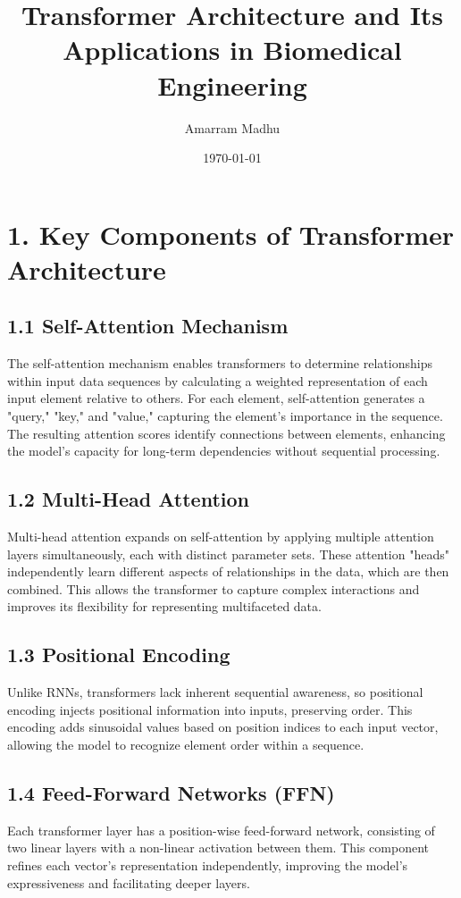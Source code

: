 \documentclass[12pt]{article}
\title{Transformer Architecture and Its Applications in Biomedical Engineering}
\author{Amarram Madhu}
\date{\today}
\begin{document}
\maketitle

\section*{1. Key Components of Transformer Architecture}

\subsection*{1.1 Self-Attention Mechanism}
The self-attention mechanism enables transformers to determine relationships within input data sequences by calculating a weighted representation of each input element relative to others. For each element, self-attention generates a "query," "key," and "value," capturing the element's importance in the sequence. The resulting attention scores identify connections between elements, enhancing the model's capacity for long-term dependencies without sequential processing.

\subsection*{1.2 Multi-Head Attention}
Multi-head attention expands on self-attention by applying multiple attention layers simultaneously, each with distinct parameter sets. These attention "heads" independently learn different aspects of relationships in the data, which are then combined. This allows the transformer to capture complex interactions and improves its flexibility for representing multifaceted data.

\subsection*{1.3 Positional Encoding}
Unlike RNNs, transformers lack inherent sequential awareness, so positional encoding injects positional information into inputs, preserving order. This encoding adds sinusoidal values based on position indices to each input vector, allowing the model to recognize element order within a sequence.

\subsection*{1.4 Feed-Forward Networks (FFN)}
Each transformer layer has a position-wise feed-forward network, consisting of two linear layers with a non-linear activation between them. This component refines each vector's representation independently, improving the model's expressiveness and facilitating deeper layers.
\end{document}
